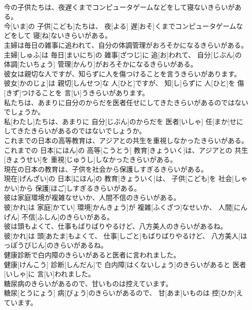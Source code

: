 \documentclass[8pt]{extreport}
\begin{document}
\begin{CJK}{UTF8}{min}
\\	今の子供たちは、夜遅くまでコンピュータゲームなどをして寝ないきらいがある。	
\\	今[いま]の 子供[こども]たちは、 夜[よる] 遅[おそ]くまでコンピュータゲームなどをして 寝[ね]ないきらいがある。
\\	主婦は毎日の雑事に追われて、自分の体調管理がおろそかになるきらいがある。	
\\	主婦[しゅふ]は 毎日[まいにち]の 雑事[ざつじ]に 追[お]われて、 自分[じぶん]の 体調[たいちょう] 管理[かんり]がおろそかになるきらいがある。
\\	彼女は親切な人ですが、知らずに人を傷つけることを言うきらいがあります。	
\\	彼女[かのじょ]は 親切[しんせつ]な 人[ひと]ですが、 知[し]らずに 人[ひと]を 傷[きず]つけることを 言[い]うきらいがあります。
\\	私たちは、あまりに自分のからだを医者任せにしてきたきらいがあるのではないでしょうか。	
\\	私[わたし]たちは、あまりに 自分[じぶん]のからだを 医者[いしゃ] 任[まか]せにしてきたきらいがあるのではないでしょうか。
\\	これまでの日本の高等教育は、アジアとの共生を重視しなかったきらいがある。	
\\	これまでの 日本[にほん]の 高等[こうとう] 教育[きょういく]は、アジアとの 共生[きょうせい]を 重視[じゅうし]しなかったきらいがある。
\\	現在の日本の教育は、子供を社会から保護しすぎるきらいがある。	
\\	現在[げんざい]の 日本[にほん]の 教育[きょういく]は、 子供[こども]を 社会[しゃかい]から 保護[ほご]しすぎるきらいがある。
\\	彼は家庭環境が複雑なせいか、人間不信のきらいがある。	
\\	彼[かれ]は 家庭[かてい] 環境[かんきょう]が 複雑[ふくざつ]なせいか、 人間[にんげん] 不信[ふしん]のきらいがある。
\\	彼は頭もよくて、仕事もばりばりやるけど、八方美人のきらいがあるね。	
\\	彼[かれ]は 頭[あたま]もよくて、 仕事[しごと]もばりばりやるけど、 八方美人[はっぽうびじん]のきらいがあるね。
\\	健康診断で白内障のきらいがあると医者に言われました。	
\\	健康[けんこう] 診断[しんだん]で 白内障[はくないしょう]のきらいがあると 医者[いしゃ]に 言[い]われました。
\\	糖尿病のきらいがあるので、甘いものは控えています。	
\\	糖尿[とうにょう] 病[びょう]のきらいがあるので、 甘[あま]いものは 控[ひか]えています。

\end{CJK}
\end{document}

